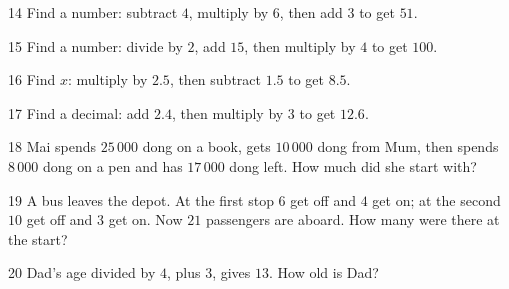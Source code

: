 \gap
\begin{probbox}{14}{\relax}
Find a number: subtract $4$, multiply by $6$, then add $3$ to get $51$.
\end{probbox}
\gap
\begin{probbox}{15}{\relax}
Find a number: divide by $2$, add $15$, then multiply by $4$ to get $100$.
\end{probbox}
\gap
\begin{probbox}{16}{\relax}
Find $x$: multiply by $2.5$, then subtract $1.5$ to get $8.5$.
\end{probbox}
\gap
\begin{probbox}{17}{\relax}
Find a decimal: add $2.4$, then multiply by $3$ to get $12.6$.
\end{probbox}
\gap
\begin{probbox}{18}{\relax}
Mai spends $25\,000$ dong on a book, gets $10\,000$ dong from Mum, then spends $8\,000$ dong on a pen and has $17\,000$ dong left. How much did she start with?
\end{probbox}
\gap
\begin{probbox}{19}{\relax}
A bus leaves the depot. At the first stop $6$ get off and $4$ get on; at the second $10$ get off and $3$ get on. Now $21$ passengers are aboard. How many were there at the start?
\end{probbox}
\gap
\begin{probbox}{20}{\relax}
Dad's age divided by $4$, plus $3$, gives $13$. How old is Dad?
\end{probbox}
